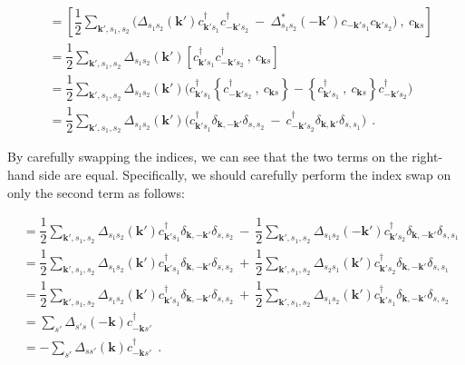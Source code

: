 \documentclass[a4j]{jsarticle}
\begin{document}
\begin{align}
	[ \mathcal{H}_{\rm BCS} \ , \ c_{\bm{k}s} ]
	&=
	\left[
		\dfrac{1}{2}
		\sum_{\bm{k}',s_{1},s_{2}}
		\Big(
		\Delta_{ s_{1} s_{2} }( \bm{k}' )
		c_{\bm{k}' s_{1}}^{\dagger}
		c_{-\bm{k}' s_{2}}^{\dagger}
		\ - \
		\Delta_{ s_{1} s_{2} }^{*}( - \bm{k}' )
		c_{-\bm{k}' s_{1}}
		c_{\bm{k}' s_{2}}
		\Big)
		\ , \
		c_{\bm{k}s}
		\right]
	\nonumber \\[2mm] &=
	\dfrac{1}{2}
	\sum_{\bm{k}',s_{1},s_{2}}
	\Delta_{ s_{1} s_{2} }( \bm{k}' )
	\left[
		c_{\bm{k}' s_{1}}^{\dagger}
		c_{-\bm{k}' s_{2}}^{\dagger}
		\ , \
		c_{\bm{k}s}
		\right]
	\nonumber \\[2mm] &=
	\dfrac{1}{2}
	\sum_{\bm{k}',s_{1},s_{2}}
	\Delta_{ s_{1} s_{2} }( \bm{k}' )
	\Big(
	c_{\bm{k}' s_{1}}^{\dagger}
	\left\{
	c_{-\bm{k}' s_{2}}^{\dagger}
	\ , \
	c_{\bm{k}s}
	\right\}
	-
	\left\{
	c_{\bm{k}' s_{1}}^{\dagger}
	\ , \
	c_{\bm{k}s}
	\right\}
	c_{-\bm{k}' s_{2}}^{\dagger}
	\Big)
	\nonumber \\[2mm] &=
	\dfrac{1}{2}
	\sum_{\bm{k}',s_{1},s_{2}}
	\Delta_{ s_{1} s_{2} }( \bm{k}' )
	\Big(
	c_{\bm{k}' s_{1}}^{\dagger}
	\delta_{\bm{k},-\bm{k}'}
	\delta_{s,s_{2}}
	\ - \
	c_{-\bm{k}' s_{2}}^{\dagger}
	\delta_{\bm{k},\bm{k}'}
	\delta_{s,s_{1}}
	\Big)
	\ \ .
\end{align}

By carefully swapping the indices, we can see that the two terms on the right-hand side are equal.
Specifically, we should carefully perform the index swap on only the second term as follows:

\begin{align}
	[ \mathcal{H}_{\rm BCS} \ , \ c_{\bm{k}s} ]
	&=
	\dfrac{1}{2}
	\sum_{\bm{k}',s_{1},s_{2}}
	\Delta_{ s_{1} s_{2} }( \bm{k}' )
	c_{\bm{k}' s_{1}}^{\dagger}
	\delta_{\bm{k},-\bm{k}'}
	\delta_{s,s_{2}}
	\ - \
	\dfrac{1}{2}
	\sum_{\bm{k}',s_{1},s_{2}}
	\Delta_{ s_{1} s_{2} }( - \bm{k}' )
	c_{\bm{k}' s_{2}}^{\dagger}
	\delta_{\bm{k},-\bm{k}'}
	\delta_{s,s_{1}}
	\nonumber \\[2mm] &=
	\dfrac{1}{2}
	\sum_{\bm{k}',s_{1},s_{2}}
	\Delta_{ s_{1} s_{2} }( \bm{k}' )
	c_{\bm{k}' s_{1}}^{\dagger}
	\delta_{\bm{k},-\bm{k}'}
	\delta_{s,s_{2}}
	\ + \
	\dfrac{1}{2}
	\sum_{\bm{k}',s_{1},s_{2}}
	\Delta_{ s_{2} s_{1} }( \bm{k}' )
	c_{\bm{k}' s_{2}}^{\dagger}
	\delta_{\bm{k},-\bm{k}'}
	\delta_{s,s_{1}}
	\nonumber \\[2mm] &=
	\dfrac{1}{2}
	\sum_{\bm{k}',s_{1},s_{2}}
	\Delta_{ s_{1} s_{2} }( \bm{k}' )
	c_{\bm{k}' s_{1}}^{\dagger}
	\delta_{\bm{k},-\bm{k}'}
	\delta_{s,s_{2}}
	\ + \
	\dfrac{1}{2}
	\sum_{\bm{k}',s_{1},s_{2}}
	\Delta_{ s_{1} s_{2} }( \bm{k}' )
	c_{\bm{k}' s_{1}}^{\dagger}
	\delta_{\bm{k},-\bm{k}'}
	\delta_{s,s_{2}}
	\nonumber \\[2mm] &=
	\sum_{ s' }
	\Delta_{ s' s }( - \bm{k} )
	c_{ - \bm{k} s'}^{\dagger}
	\nonumber \\[2mm] &=
	-
	\sum_{ s' }
	\Delta_{ s s' }( \bm{k} )
	c_{ - \bm{k} s'}^{\dagger}
	\ \ .
\end{align}
\end{document}
